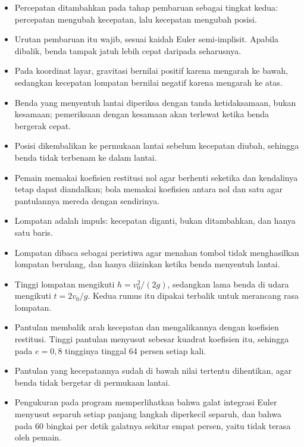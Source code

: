 
\begin{rangkumanbox}
\begin{itemize}
  \item Percepatan ditambahkan pada tahap pembaruan sebagai tingkat kedua:
        percepatan mengubah kecepatan, lalu kecepatan mengubah posisi.
  \item Urutan pembaruan itu wajib, sesuai kaidah Euler semi-implisit. Apabila
        dibalik, benda tampak jatuh lebih cepat daripada seharusnya.
  \item Pada koordinat layar, gravitasi bernilai positif karena mengarah ke
        bawah, sedangkan kecepatan lompatan bernilai negatif karena mengarah
        ke atas.
  \item Benda yang menyentuh lantai diperiksa dengan tanda ketidaksamaan, bukan
        kesamaan; pemeriksaan dengan kesamaan akan terlewat ketika benda
        bergerak cepat.
  \item Posisi dikembalikan ke permukaan lantai sebelum kecepatan diubah,
        sehingga benda tidak terbenam ke dalam lantai.
  \item Pemain memakai koefisien restitusi nol agar berhenti seketika dan
        kendalinya tetap dapat diandalkan; bola memakai koefisien antara nol
        dan satu agar pantulannya mereda dengan sendirinya.
  \item Lompatan adalah impuls: kecepatan diganti, bukan ditambahkan, dan hanya
        satu baris.
  \item Lompatan dibaca sebagai peristiwa  agar menahan tombol
        tidak menghasilkan lompatan berulang, dan hanya diizinkan ketika benda
        menyentuh lantai.
  \item Tinggi lompatan mengikuti $h = v_0^2 / (2g)$, sedangkan lama benda di
        udara mengikuti $t = 2v_0/g$. Kedua rumus itu dipakai terbalik untuk
        merancang rasa lompatan.
  \item Pantulan membalik arah kecepatan dan mengalikannya dengan koefisien
        restitusi. Tinggi pantulan menyusut sebesar kuadrat koefisien itu,
        sehingga pada $e = 0{,}8$ tingginya tinggal 64 persen setiap kali.
  \item Pantulan yang kecepatannya sudah di bawah nilai tertentu dihentikan,
        agar benda tidak bergetar di permukaan lantai.
  \item Pengukuran pada program memperlihatkan bahwa galat integrasi Euler
        menyusut separuh setiap panjang langkah diperkecil separuh, dan bahwa
        pada 60 bingkai per detik galatnya sekitar empat persen, yaitu tidak
        terasa oleh pemain.
\end{itemize}
\end{rangkumanbox}
